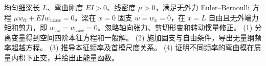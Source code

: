 均匀细梁长 \(L\)、弯曲刚度 \(EI>0\)、线密度 \(\mu>0\)，满足无外力 Euler--Bernoulli 方程 \(\mu w_{tt}+EI w_{xxxx}=0\)。梁在 \(x=0\) 固支 \(w=w_x=0\)，在 \(x=L\) 自由且无外端力矩和剪力，即 \(w_{xx}=w_{xxx}=0\)。忽略轴向张力、剪切形变和转动惯量修正。
(1) 分离变量得到空间四阶本征方程和一般解。
(2) 施加固支与自由条件，导出无量纲频率超越方程。
(3) 推导本征频率及首模尺度关系。
(4) 证明不同频率的弯曲模在质量内积下正交，并给出正能量函数。
